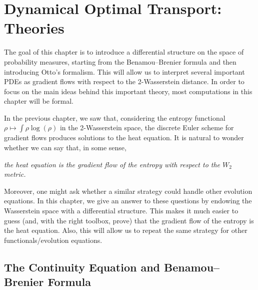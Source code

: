\documentclass[11pt]{book}
\begin{document}
\chapter[Dynamical OT]{Dynamical Optimal Transport: Theories}\label{chapter:DOT}



The goal of this chapter is to introduce a differential structure on the space of probability measures, starting from the Benamou--Brenier formula and then introducing Otto's formalism. This will allow us to interpret several important PDEs as gradient flows with respect to the 2-Wasserstein distance. In order to focus on the main ideas behind this important theory, most computations in this chapter will be formal.

In the previous chapter, we saw that, considering the entropy functional 
$
\rho \mapsto \int \rho \log(\rho)
$
in the 2-Wasserstein space, the discrete Euler scheme for gradient flows produces solutions to the heat equation. It is natural to wonder whether we can say that, in some sense,

\begin{center}
\textit{the heat equation is the gradient flow of the entropy with respect to the $W_2$ metric.}
\end{center}

Moreover, one might ask whether a similar strategy could handle other evolution equations. In this chapter, we give an answer to these questions by endowing the Wasserstein space with a differential structure. This makes it much easier to guess (and, with the right toolbox, prove) that the gradient flow of the entropy is the heat equation. Also, this will allow us to repeat the same strategy for other functionals/evolution equations.

\section[Benamou-Brenier]{The Continuity Equation and Benamou--Brenier Formula}
\end{document}
